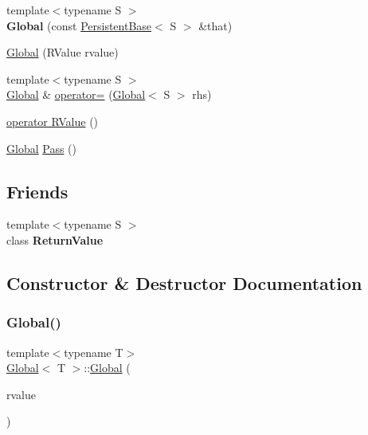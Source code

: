 \begin{DoxyCompactItemize}
{\footnotesize template$<$typename S $>$ }\\{\bfseries Global} (const \hyperlink{class_persistent_base}{Persistent\+Base}$<$ S $>$ \&that)
\item 
\hyperlink{class_global_a65c7a2d21668b0a4324e22bc34b2d156}{Global} (R\+Value rvalue)
\item 
{\footnotesize template$<$typename S $>$ }\\\hyperlink{class_global}{Global} \& \hyperlink{class_global_a7bbb1da50ed4ba8f3e7f315c99f09335}{operator=} (\hyperlink{class_global}{Global}$<$ S $>$ rhs)
\item 
\hyperlink{class_global_a76e16adc08101c6e20e4460fd202f44b}{operator R\+Value} ()
\item 
\hyperlink{class_global}{Global} \hyperlink{class_global_a60ed905942749405e9d916d3de627f72}{Pass} ()
\end{DoxyCompactItemize}
\subsection*{Friends}
\begin{DoxyCompactItemize}
\item 
\mbox{\label{class_global_a53f604d3d6f2dc0647df33c9979f116a}} 
{\footnotesize template$<$typename S $>$ }\\class {\bfseries Return\+Value}
\end{DoxyCompactItemize}


\subsection{Constructor \& Destructor Documentation}
\mbox{\label{class_global_a65c7a2d21668b0a4324e22bc34b2d156}} 
\subsubsection{\texorpdfstring{Global()}{Global()}}
{\footnotesize\ttfamily template$<$typename T$>$ \\
\hyperlink{class_global}{Global}$<$ T $>$\+::\hyperlink{class_global}{Global} (\begin{DoxyParamCaption}\item[{R\+Value}]{rvalue }\end{DoxyParamCaption})\hspace{0.3cm}{\ttfamily [inline]}}

